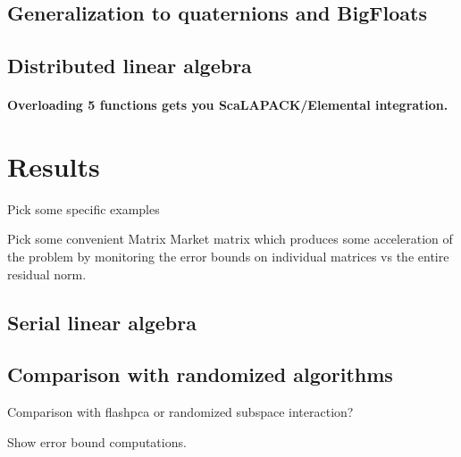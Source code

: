 \documentclass[final,leqno]{siamltex1213}
\begin{document}

\subsection{Generalization to quaternions and BigFloats}


\subsection{Distributed linear algebra}

\paragraph{Overloading 5 functions gets you ScaLAPACK/Elemental integration.}




\section{Results}

Pick some specific examples

Pick some convenient Matrix Market matrix which produces some acceleration of
the problem by monitoring the error bounds on individual matrices vs the entire
residual norm.




\subsection{Serial linear algebra}





\subsection{Comparison with randomized algorithms}

Comparison with flashpca or randomized subspace interaction?

Show error bound computations.

\end{document}
